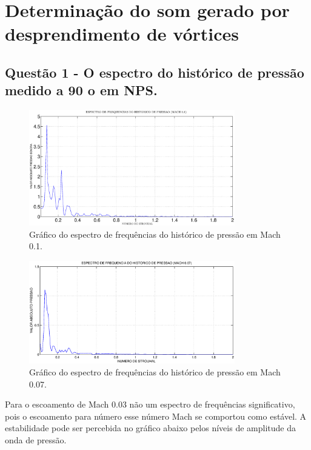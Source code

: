 \chapter{Determinação do som gerado por desprendimento de vórtices}

\section{Questão 1 - O espectro do histórico de pressão medido a 90 o em NPS.}

\begin{figure}[h!]
    \centering
    \hspace{-1.cm}
    \includegraphics[width=0.8\textwidth]{Mach_0.1/fft_pressure.eps}
    \caption{Gráfico do espectro de frequências do histórico de pressão em Mach 0.1.}
\end{figure}

\begin{figure}[h!]
    \centering
    \hspace{-1.cm}
    \includegraphics[width=0.8\textwidth]{Mach_0.07/fft_pressao.eps}
    \caption{Gráfico do espectro de frequências do histórico de pressão em Mach 0.07.}
\end{figure}

\newpage
Para o escoamento de Mach 0.03 não um espectro de frequências significativo, pois o escoamento para número esse número Mach se comportou como estável. A estabilidade pode ser percebida no gráfico abaixo pelos níveis de amplitude da onda de pressão.

